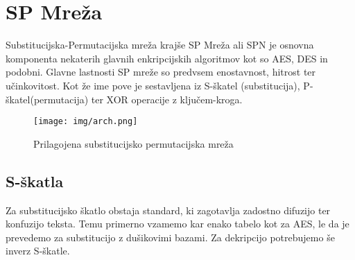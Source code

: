 \documentclass[graybox, envcountchap]{svmult}
\begin{document}
\section{SP Mreža}
\label{g01:sec:2}

Substitucijska-Permutacijska mreža krajše SP Mreža ali SPN je osnovna komponenta nekaterih glavnih enkripcijskih algoritmov kot so AES, DES in podobni. Glavne lastnosti SP mreže so predvsem enostavnost, hitrost ter učinkovitost. Kot že ime pove je sestavljena iz S-škatel (substitucija), P-škatel(permutacija) ter XOR operacije z ključem-kroga.

\begin{figure}[H]
\centering
\texttt{[image: img/arch.png]}
\caption{Prilagojena substitucijsko permutacijska mreža}
\label{fig:g0}
\end{figure}

\newpage

\subsection{S-škatla}
\label{g01:subsec:1}
Za substitucijsko škatlo obstaja standard, ki zagotavlja zadostno difuzijo ter konfuzijo teksta. Temu primerno vzamemo kar enako tabelo kot za AES, le da je prevedemo za substitucijo z dušikovimi bazami. Za dekripcijo potrebujemo še inverz S-škatle. 
\end{document}
